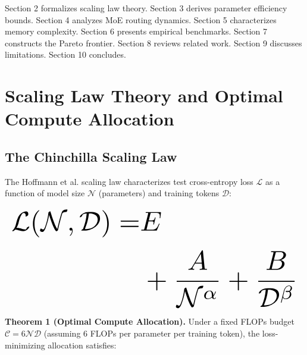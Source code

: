 \documentclass[10pt,twocolumn,letterpaper]{article}
\begin{document}
Section 2 formalizes scaling law theory. Section 3 derives parameter efficiency bounds. Section 4 analyzes MoE routing dynamics. Section 5 characterizes memory complexity. Section 6 presents empirical benchmarks. Section 7 constructs the Pareto frontier. Section 8 reviews related work. Section 9 discusses limitations. Section 10 concludes.




\section{Scaling Law Theory and Optimal Compute Allocation}



\subsection{The Chinchilla Scaling Law}


The Hoffmann et al. scaling law \cite{arxiv_2005_14165} characterizes test cross-entropy loss $\mathcal{L}$ as a function of model size $\mathcal{N}$ (parameters) and training tokens $\mathcal{D}$:























\begin{equation}
\resizebox{\columnwidth}{!}{$\displaystyle
\begin{aligned}
\mathcal{L}(\mathcal{N}, \mathcal{D}) = & E \\
& + \frac{A}{\mathcal{N}^\alpha} + \frac{B}{\mathcal{D}^\beta}
\end{aligned}
$}
\end{equation}























\textbf{Theorem 1 (Optimal Compute Allocation).} Under a fixed FLOPs budget $\mathcal{C} = 6\mathcal{N}\mathcal{D}$ (assuming 6 FLOPs per parameter per training token), the loss-minimizing allocation satisfies:
\end{document}
